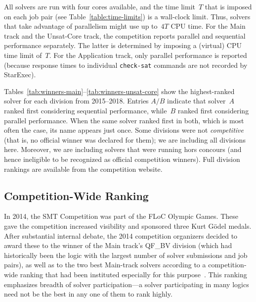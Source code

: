 \documentclass[dvipsnames,table,twoside,11pt]{article}
\begin{document}
All solvers are run with four cores available, and the time limit~$T$
that is imposed on each job pair (see Table~\ref{table:time-limits})
is a wall-clock limit.  Thus, solvers that take advantage of
parallelism might use up to~$4T$ CPU time.  For the Main track and the
Unsat-Core track, the competition reports parallel and sequential
performance separately.  The latter is determined by imposing a
(virtual) CPU time limit of~$T$.  For the Application track, only
parallel performance is reported (because response times to individual
{\tt check-sat} commands are not recorded by StarExec).

Tables~\ref{tab:winners-main}--\ref{tab:winners-unsat-core} show the
highest-ranked solver for each division from 2015--2018.  Entries
$A/B$ indicate that solver~$A$ ranked first considering sequential
performance, while~$B$ ranked first considering parallel performance.
When the same solver ranked first in both, which is most often the
case, its name appears just once.  Some divisions were not
\emph{competitive} (that is, no official winner was declared for
them); we are including all divisions here.  Moreover, we are
including solvers that were running hors concours (and hence
ineligible to be recognized as official competition winners).  Full
division rankings are available from the competition website.








\subsection{Competition-Wide Ranking}
\label{sec:floc}

In 2014, the SMT Competition was part of the FLoC Olympic Games.
These gave the competition increased visibility and sponsored three
Kurt G\"odel medals.  After substantial internal debate, the 2014
competition organizers decided to award these to the winner of the
Main track's QF\_BV division (which had historically been the logic
with the largest number of solver submissions and job pairs), as well
as to the two best Main-track solvers according to a competition-wide
ranking that had been instituted especially for this
purpose~\cite{CDW14}.  This ranking emphasizes breadth of solver
participation---a solver participating in many logics need not be the
best in any one of them to rank highly.
\end{document}

